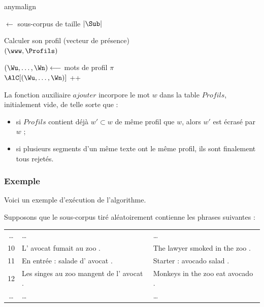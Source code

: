 \documentclass[a4paper,10pt]{article}
\begin{document}
\begin{algorithm}
\caption{anymalign \label{algoanym}}
             


\Debut
{
	{
		\Sub $\leftarrow$ sous-corpus de taille $|\Sub|$

		{
			{
				Calculer son profil (vecteur de présence) \\
				\ajouter$(\www,\Profils)$
			}

			{
				$(\Wu,\dots,\Wn) \longleftarrow$ mots de profil $\pi$ \\
				$\AlC[(\Wu,\dots,\Wn)]$ ++
			}
		}
	}
	\Retour \AlC
}
\end{algorithm}

La fonction auxiliaire $ajouter$ incorpore le mot $w$ dans la table $Profils$, initialement vide, de telle sorte que :

\begin{itemize}
\item si $Profils$ contient déjà $w'\subset w$ de même profil que $w$, alors $w'$ est écrasé par $w$ ;
\item si plusieurs segments d'un même texte ont le même profil, ils sont finalement tous rejetés.
\end{itemize}

\subsubsection{Exemple}

Voici un exemple d'exécution de l'algorithme.

Supposons que le sous-corpus tiré aléatoirement contienne les phrases suivantes :

\begin{tabular}{|c|l|l|}
\hline
\dots & \dots & \dots \\
10 & L' avocat fumait au zoo . & The lawyer smoked in the zoo . \\
11 & En entrée : salade d' avocat . & Starter : avocado salad . \\
12 & Les singes au zoo mangent de l' avocat . & Monkeys in the zoo eat avocado . \\
\dots & \dots & \dots \\
\hline
\end{tabular}
\end{document}
